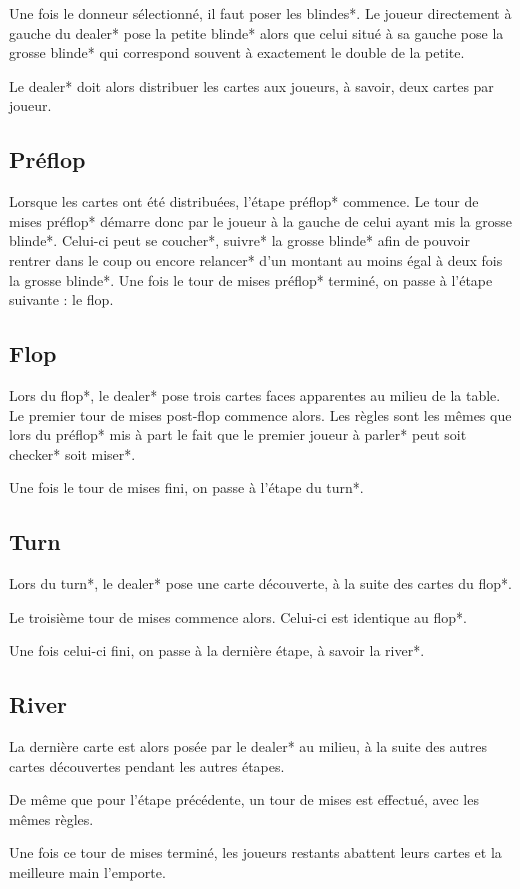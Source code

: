 \documentclass{report}
\begin{document}
Une fois le donneur sélectionné, il faut poser les blindes*. Le joueur directement à gauche du dealer* pose la petite blinde* alors que celui situé à sa gauche pose la grosse blinde* qui correspond souvent à exactement le double de la petite.\par

Le dealer* doit alors distribuer les cartes aux joueurs, à savoir, deux cartes par joueur. \par
\subsection{Préflop}
\hspace{0.5cm}Lorsque les cartes ont été distribuées, l'étape préflop* commence. Le tour de mises préflop* démarre donc par le joueur à la gauche de celui ayant mis la grosse blinde*. Celui-ci peut se coucher*, suivre* la grosse blinde* afin de pouvoir rentrer dans le coup ou encore relancer* d'un montant au moins égal à deux fois la grosse blinde*. Une fois le tour de mises préflop* terminé, on passe à l'étape suivante : le flop.\par

\subsection{Flop}
\hspace{0.5cm}Lors du flop*, le dealer* pose trois cartes faces apparentes au milieu de la table. Le premier tour de mises post-flop commence alors. Les règles sont les mêmes que lors du préflop* mis à part le fait que le premier joueur à parler* peut soit checker* soit miser*.\par

Une fois le tour de mises fini, on passe à l'étape du turn*.\par
\subsection{Turn}
Lors du turn*, le dealer* pose une carte découverte, à la suite des cartes du flop*. \par

Le troisième tour de mises commence alors. Celui-ci est identique au flop*.\par

Une fois celui-ci fini, on passe à la dernière étape, à savoir la river*.\par
\subsection{River}
\hspace{0.5cm}La dernière carte est alors posée par le dealer* au milieu, à la suite des autres cartes découvertes pendant les autres étapes. \par
De même que pour l'étape précédente, un tour de mises est effectué, avec les mêmes règles.\par
Une fois ce tour de mises terminé, les joueurs restants abattent leurs cartes et la meilleure main l'emporte.\par
\end{document}
